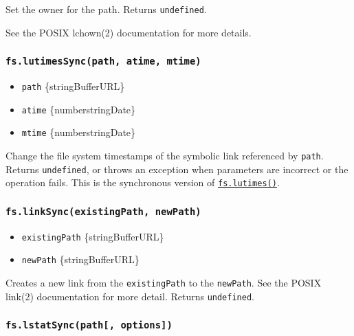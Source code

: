 Set the owner for the path. Returns \texttt{undefined}.

See the POSIX lchown(2) documentation for more details.

\subsubsection{\texorpdfstring{\texttt{fs.lutimesSync(path,\ atime,\ mtime)}}{fs.lutimesSync(path, atime, mtime)}}\label{fs.lutimessyncpath-atime-mtime}

\begin{itemize}
\tightlist
\item
  \texttt{path} \{string\textbar Buffer\textbar URL\}
\item
  \texttt{atime} \{number\textbar string\textbar Date\}
\item
  \texttt{mtime} \{number\textbar string\textbar Date\}
\end{itemize}

Change the file system timestamps of the symbolic link referenced by
\texttt{path}. Returns \texttt{undefined}, or throws an exception when
parameters are incorrect or the operation fails. This is the synchronous
version of
\hyperref[fslutimespath-atime-mtime-callback]{\texttt{fs.lutimes()}}.

\subsubsection{\texorpdfstring{\texttt{fs.linkSync(existingPath,\ newPath)}}{fs.linkSync(existingPath, newPath)}}\label{fs.linksyncexistingpath-newpath}

\begin{itemize}
\tightlist
\item
  \texttt{existingPath} \{string\textbar Buffer\textbar URL\}
\item
  \texttt{newPath} \{string\textbar Buffer\textbar URL\}
\end{itemize}

Creates a new link from the \texttt{existingPath} to the
\texttt{newPath}. See the POSIX link(2) documentation for more detail.
Returns \texttt{undefined}.

\subsubsection{\texorpdfstring{\texttt{fs.lstatSync(path{[},\ options{]})}}{fs.lstatSync(path{[}, options{]})}}\label{fs.lstatsyncpath-options}

